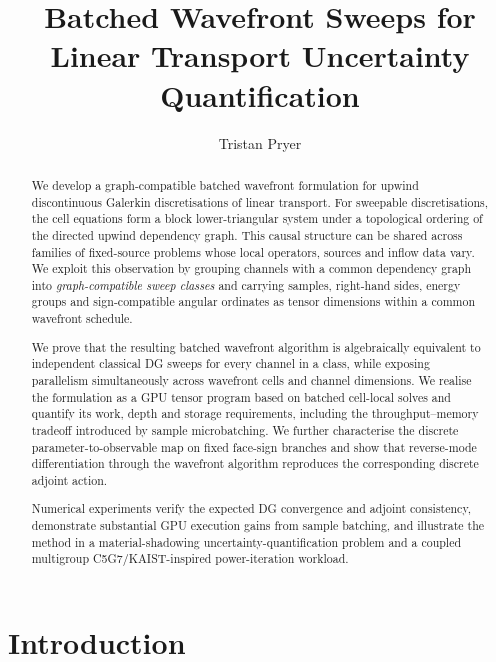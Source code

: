 \documentclass[final]{amsart}
\author[1,2]{Tristan Pryer}
\begin{document}
\title{Batched Wavefront Sweeps for Linear Transport Uncertainty Quantification}

\begin{abstract}
  We develop a graph-compatible batched wavefront formulation for
  upwind discontinuous Galerkin discretisations of linear transport.
  For sweepable discretisations, the cell equations form a block
  lower-triangular system under a topological ordering of the directed
  upwind dependency graph. This causal structure can be shared across
  families of fixed-source problems whose local operators, sources and
  inflow data vary. We exploit this observation by grouping channels
  with a common dependency graph into \emph{graph-compatible sweep
  classes} and carrying samples, right-hand sides, energy groups and
  sign-compatible angular ordinates as tensor dimensions within a
  common wavefront schedule.

  We prove that the resulting batched wavefront algorithm is
  algebraically equivalent to independent classical DG sweeps for
  every channel in a class, while exposing parallelism simultaneously
  across wavefront cells and channel dimensions. We realise the
  formulation as a GPU tensor program based on batched cell-local
  solves and quantify its work, depth and storage requirements,
  including the throughput--memory tradeoff introduced by sample
  microbatching.  We further characterise the discrete
  parameter-to-observable map on fixed face-sign branches and show
  that reverse-mode differentiation through the wavefront algorithm
  reproduces the corresponding discrete adjoint action.

  Numerical experiments verify the expected DG convergence and adjoint
  consistency, demonstrate substantial GPU execution gains from sample
  batching, and illustrate the method in a material-shadowing
  uncertainty-quantification problem and a coupled multigroup
  C5G7/KAIST-inspired power-iteration workload.
\end{abstract}


\maketitle

\section{Introduction}
\label{sec:introduction}
\end{document}
